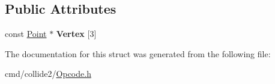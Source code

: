 \subsection*{Public Attributes}
\begin{DoxyCompactItemize}
\item 
const \hyperlink{classOpcode_1_1Point}{Point} $\ast$ {\bfseries Vertex} \mbox{[}3\mbox{]}\hypertarget{structOpcode_1_1VertexPointers_a3950f909835d67eda5e7312f45f45c0e}{}\label{structOpcode_1_1VertexPointers_a3950f909835d67eda5e7312f45f45c0e}

\end{DoxyCompactItemize}


The documentation for this struct was generated from the following file\+:\begin{DoxyCompactItemize}
\item 
cmd/collide2/\hyperlink{Opcode_8h}{Opcode.\+h}\end{DoxyCompactItemize}
